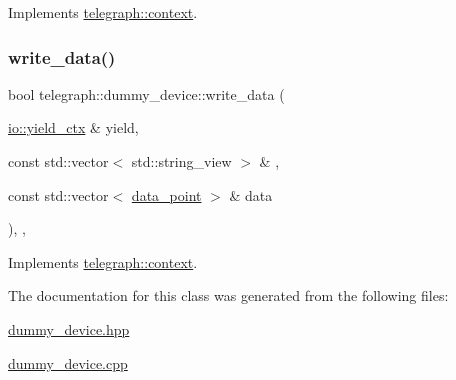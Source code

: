 Implements \hyperlink{classtelegraph_1_1context_a6067b9a6f2590733c81f6a3b2ed9cba7}{telegraph\+::context}.

\mbox{\label{classtelegraph_1_1dummy__device_a2d18fd0ec74a6d4bb76f789135403f19}} 
\subsubsection{\texorpdfstring{write\+\_\+data()}{write\_data()}\hspace{0.1cm}{\footnotesize\ttfamily [2/2]}}
{\footnotesize\ttfamily bool telegraph\+::dummy\+\_\+device\+::write\+\_\+data (\begin{DoxyParamCaption}\item[{\hyperlink{structboost_1_1asio_1_1yield__ctx}{io\+::yield\+\_\+ctx} \&}]{yield,  }\item[{const std\+::vector$<$ std\+::string\+\_\+view $>$ \&}]{,  }\item[{const std\+::vector$<$ \hyperlink{classtelegraph_1_1data__point}{data\+\_\+point} $>$ \&}]{data }\end{DoxyParamCaption})\hspace{0.3cm}{\ttfamily [inline]}, {\ttfamily [override]}, {\ttfamily [virtual]}}



Implements \hyperlink{classtelegraph_1_1context_a1f600d6159df21dd2750b1c706ca3412}{telegraph\+::context}.



The documentation for this class was generated from the following files\+:\begin{DoxyCompactItemize}
\item 
\hyperlink{dummy__device_8hpp}{dummy\+\_\+device.\+hpp}\item 
\hyperlink{dummy__device_8cpp}{dummy\+\_\+device.\+cpp}\end{DoxyCompactItemize}
